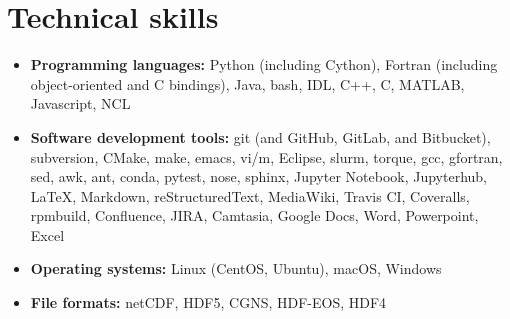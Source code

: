 \section{Technical skills}
\vspace{0.5em}

\begin{itemize}

  \item \textbf{Programming languages:} Python (including Cython),
    Fortran (including object-oriented and C bindings), Java, bash,
    IDL, C++, C, MATLAB, Javascript, NCL

  \item \textbf{Software development tools:} git (and GitHub, GitLab,
    and Bitbucket), subversion, CMake, make, emacs, vi/m, Eclipse,
    slurm, torque, gcc, gfortran, sed, awk, ant, conda, pytest, nose,
    sphinx, Jupyter Notebook, Jupyterhub, \LaTeX, Markdown,
    reStructuredText, MediaWiki, {Travis CI}, Coveralls, rpmbuild,
    Confluence, JIRA, Camtasia, Google Docs, Word, Powerpoint, Excel

  \item \textbf{Operating systems:} Linux (CentOS, Ubuntu), macOS,
    Windows

  \item \textbf{File formats:} netCDF, HDF5, CGNS, HDF-EOS, HDF4

\end{itemize}
